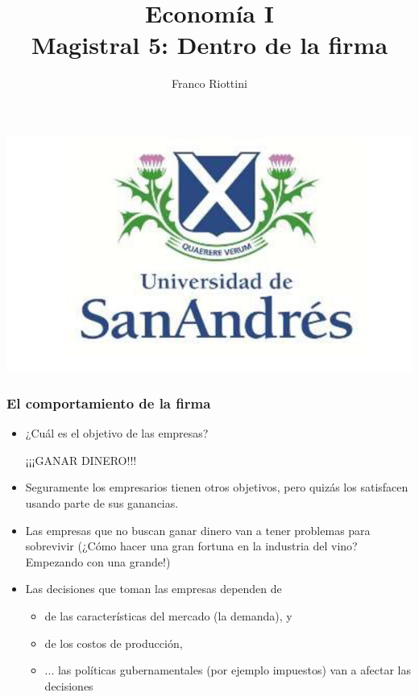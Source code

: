 \documentclass{beamer}
\title[Economía I]{Economía I \vspace{4mm}
\\ Magistral 5: Dentro de la firma}
\date{}
\author[Riottini]{Franco Riottini}
\institute[]{Universidad de San Andrés}
\begin{document}
\begin{frame}
\titlepage
\centering
\includegraphics[scale=0.2]{../Figures/logoUDESA.jpg} 
\end{frame}

\begin{frame}
    \frametitle{El comportamiento de la firma}
    \begin{itemize}
        \item ¿Cuál es el objetivo de las empresas?
        \begin{center}
            ¡¡¡GANAR DINERO!!!
        \end{center}
        \item Seguramente los empresarios tienen otros objetivos, pero quizás los satisfacen usando parte de sus ganancias. 
        \item Las empresas que no buscan ganar dinero van a tener problemas para sobrevivir (¿Cómo hacer una gran fortuna en la industria del vino? Empezando con una grande!) 
        \item Las decisiones que toman las empresas dependen de 
        \begin{itemize}
            \item de las características del mercado (la demanda), y
            \item de los costos de producción,
            \item ... las políticas gubernamentales (por ejemplo impuestos) van a afectar las decisiones
        \end{itemize}    
    \end{itemize}    
\end{frame}
\end{document}
